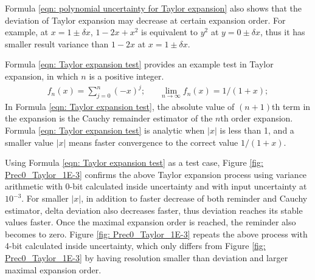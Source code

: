 \documentclass[twoside]{article}
\numberwithin{equation}{section}
\newcommand{\eqspace}{\;\;\;}
\begin{document}
Formula \eqref{eqn: polynomial uncertainty for Taylor expansion} also shows that the deviation of Taylor expansion may decrease at certain expansion order.  For example, at $x = 1 \pm \delta x$, $1 - 2x + x^2$ is equivalent to $y^2$ at $y = 0 \pm \delta x$, thus it has smaller result variance than $1 - 2x$ at $x = 1 \pm \delta x$.  

Formula \eqref{eqn: Taylor expansion test} provides an example test in Taylor expansion, in which $n$ is a positive integer.  
\begin{equation}
\begin{split}
\label{eqn: Taylor expansion test}
f_n(x) = \sum_{j=0}^{n} (-x)^j; & \eqspace \lim _{n \to \infty} f_n(x) = 1/(1+x);
\end{split}
\end{equation}
In Formula \eqref{eqn: Taylor expansion test}, the absolute value of $(n+1)$th term in the expansion is the Cauchy remainder estimator of the $n$th order expansion.  Formula \eqref{eqn: Taylor expansion test} is analytic when $|x|$ is less than 1, and a smaller value $|x|$ means faster convergence to the correct value $1/(1 + x)$. 

Using Formula \eqref{eqn: Taylor expansion test} as a test case, Figure \ref{fig: Prec0_Taylor_1E-3} confirms the above Taylor expansion process using variance arithmetic with 0-bit calculated inside uncertainty and with input uncertainty at $10^{-3}$.  For smaller $|x|$, in addition to faster decrease of both reminder and Cauchy estimator, delta deviation also decreases faster, thus deviation reaches its stable values faster.  Once the maximal expansion order is reached, the reminder also becomes to zero.  Figure \ref{fig: Prec0_Taylor_1E-3} repeats the above process with 4-bit calculated inside uncertainty, which only differs from Figure \ref{fig: Prec0_Taylor_1E-3} by having resolution smaller than deviation and larger maximal expansion order.
\end{document}
